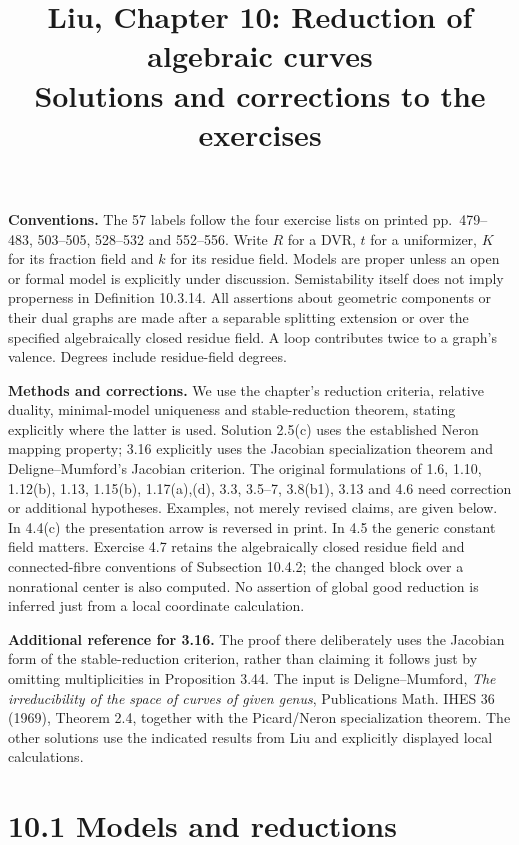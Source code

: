 \documentclass[11pt]{article}
\title{Liu, Chapter 10: Reduction of algebraic curves\\[2pt]\large Solutions and corrections to the exercises}
\author{}\date{}
\begin{document}
\maketitle
\textbf{Conventions.} The 57 labels follow the four exercise lists on printed pp.~479--483, 503--505, 528--532 and 552--556. Write $R$ for a DVR, $t$ for a uniformizer, $K$ for its fraction field and $k$ for its residue field. Models are proper unless an open or formal model is explicitly under discussion. Semistability itself does not imply properness in Definition 10.3.14. All assertions about geometric components or their dual graphs are made after a separable splitting extension or over the specified algebraically closed residue field. A loop contributes twice to a graph's valence. Degrees include residue-field degrees.

\textbf{Methods and corrections.} We use the chapter's reduction criteria, relative duality, minimal-model uniqueness and stable-reduction theorem, stating explicitly where the latter is used. Solution 2.5(c) uses the established Neron mapping property; 3.16 explicitly uses the Jacobian specialization theorem and Deligne--Mumford's Jacobian criterion. The original formulations of 1.6, 1.10, 1.12(b), 1.13, 1.15(b), 1.17(a),(d), 3.3, 3.5--7, 3.8(b1), 3.13 and 4.6 need correction or additional hypotheses. Examples, not merely revised claims, are given below. In 4.4(c) the presentation arrow is reversed in print. In 4.5 the generic constant field matters. Exercise 4.7 retains the algebraically closed residue field and connected-fibre conventions of Subsection 10.4.2; the changed block over a nonrational center is also computed. No assertion of global good reduction is inferred just from a local coordinate calculation.

\textbf{Additional reference for 3.16.} The proof there deliberately uses the Jacobian form of the stable-reduction criterion, rather than claiming it follows just by omitting multiplicities in Proposition 3.44. The input is Deligne--Mumford, \emph{The irreducibility of the space of curves of given genus}, Publications Math. IHES 36 (1969), Theorem 2.4, together with the Picard/Neron specialization theorem. The other solutions use the indicated results from Liu and explicitly displayed local calculations.

\section*{10.1 Models and reductions}
\end{document}
